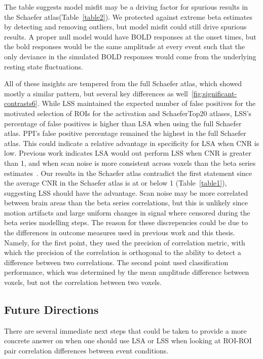 \documentclass[phd,appendix,figures]{uithesis}
\begin{document}
The table suggests model misfit may be a driving factor for spurious results in the Schaefer atlas(Table~\ref{table2}).
We protected against extreme beta estimates by detecting and removing outliers, but model misfit
could still drive spurious results.
A proper null model would have BOLD responses at the onset times, but the bold responses
would be the same amplitude at every event such that the only deviance in the simulated
BOLD responses would come from the underlying resting state fluctuations.

All of these insights are tempered from the full Schaefer atlas, which showed mostly a similar pattern,
but several key differences as well~\ref{fig:significant-contrasts6}.
While LSS maintained the expected number of false positives for the motivated selection of
ROIs for the activation and SchaeferTop20 atlases, LSS's percentage of false positives is
higher than LSA when using the full Schaefer atlas.
PPI's false positive percentage remained the highest in the full Schaefer atlas.
This could indicate a relative advantage in specificity for LSA when CNR is low.
Previous work indicates LSA would out perform LSS when CNR is greater than 1,
and when scan noise is more consistent across voxels than the beta series estimates~\cite{Abdulrahman2016}.
Our results in the Schaefer atlas contradict the first statement since the average CNR in the Schaefer atlas
is at or below 1 (Table~\ref{table1}), suggesting LSS should have the advantage.
Scan noise may be more correlated between brain areas than the beta series correlations, but this is unlikely
since motion artifacts and large uniform changes in signal where censored during the beta series modelling steps.
The reason for these discrepencies could be due to the differences in outcome measures used in previous work and
this thesis.
Namely, for the first point, they used the precision of correlation metric, with which the precision
of the correlation is orthogonal to the ability to detect a difference between two correlations.
The second point used classification performance, which was determined by the mean amplitude difference
between voxels, but not the correlation between two voxels.

\subsection*{Future Directions}

There are several immediate next steps that could be taken to provide a more concrete answer
on when one should use LSA or LSS when looking at ROI-ROI pair correlation differences between event
conditions.
\end{document}
